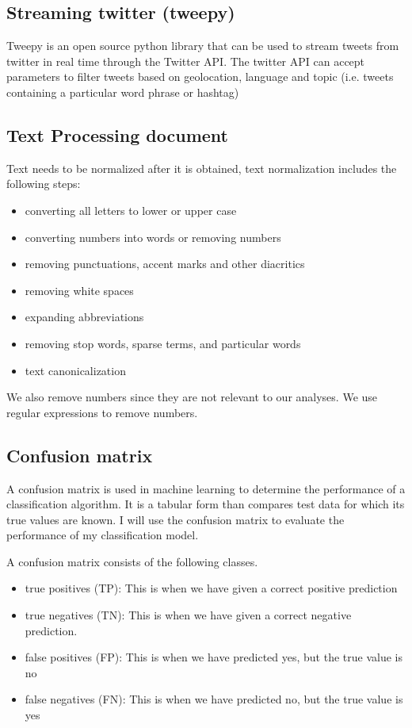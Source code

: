\subsection{Streaming twitter (tweepy)}
Tweepy is an open source python library that can be used to stream tweets from twitter in real time through the Twitter API. The twitter API can accept parameters to filter tweets based on geolocation, language and topic (i.e. tweets containing a particular word phrase or hashtag)


\subsection{Text Processing document}
Text needs to be normalized after it is obtained, text normalization includes the following steps:
\begin{itemize}
\item converting all letters to lower or upper case
\item converting numbers into words or removing numbers
\item removing punctuations, accent marks and other diacritics
\item removing white spaces
\item expanding abbreviations
\item removing stop words, sparse terms, and particular words
\item text canonicalization
\end{itemize}

We also remove numbers since they are not relevant to our analyses. We use regular expressions to remove numbers.




\subsection{Confusion matrix}
A confusion matrix is used in machine learning to determine the performance of a classification algorithm. It is a tabular form than compares test data for which its true values are known. I will use the confusion matrix to evaluate the performance of my classification model.

A confusion matrix consists of the following classes.
 \begin{itemize}

\item
true positives (TP): This is when we have given a correct positive prediction

\item
true negatives (TN): This is when we have given a correct negative prediction.

\item
false positives (FP): This is when we have predicted yes, but the true value is no

\item
false negatives (FN): This is when we have predicted no, but the true value is yes

\end{itemize}

